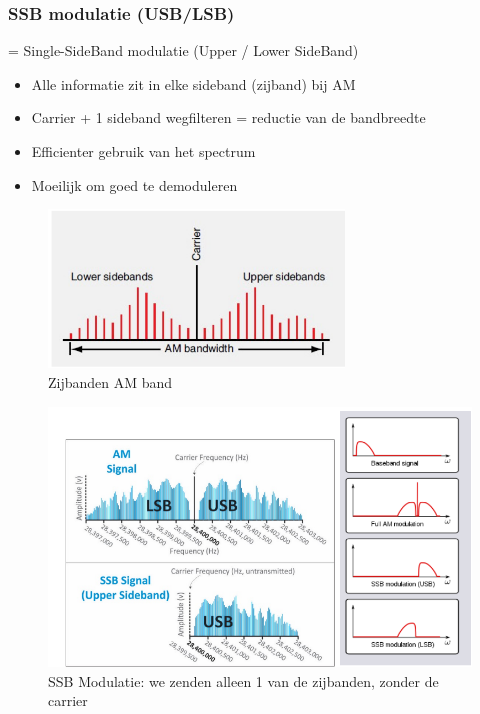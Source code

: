 \documentclass{article}
\begin{document}
\subsubsection{SSB modulatie (USB/LSB)}
= Single-SideBand modulatie (Upper / Lower SideBand)
\begin{itemize}
    \item Alle informatie zit in elke sideband (zijband) bij AM
    \item Carrier + 1 sideband wegfilteren = reductie van de bandbreedte
    \item Efficienter gebruik van het spectrum
    \item Moeilijk om goed te demoduleren
\end{itemize}
\begin{figure}[H]
    \centering
    \includegraphics[width=0.7\textwidth]{Screenshot_20200315_153734.png}
    \caption{Zijbanden AM band}
\end{figure}

\begin{figure}[H]
    \centering
    \includegraphics[width=\textwidth]{Screenshot_20200302_120812.png}    
    \caption{SSB Modulatie: we zenden alleen 1 van de zijbanden, zonder de carrier}
\end{figure}
\end{document}
